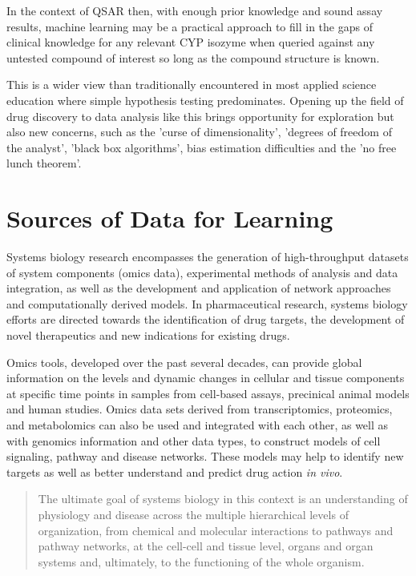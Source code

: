 In the context of QSAR then, with enough prior knowledge and sound assay results, machine learning may be a practical approach to fill in the gaps of clinical knowledge for any relevant CYP isozyme when queried against any untested compound of interest so long as the compound structure is known.

This is a wider view than traditionally encountered in most applied science education where simple hypothesis testing predominates. Opening up the field of drug discovery to data analysis like this brings opportunity for exploration but also new concerns, such as the 'curse of dimensionality', 'degrees of freedom of the analyst', 'black box algorithms', bias estimation difficulties and the 'no free lunch theorem'. \cite{Boulesteix2014}

\section{Sources of Data for Learning}

Systems biology research encompasses the generation of high-throughput datasets of system components (omics data), experimental methods of analysis and data integration, as well as the development and application of network approaches and computationally derived models. In pharmaceutical research, systems biology efforts are directed towards the identification of drug targets, the development of novel therapeutics and new indications for existing drugs. \cite{Berg2014}

Omics tools, developed over the past several decades, can provide global information on the levels and dynamic changes in cellular and tissue components at specific time points in samples from cell-based assays, precinical animal models and human studies. Omics data sets derived from transcriptomics, proteomics, and metabolomics can also be used and integrated with each other, as well as with genomics information and other data types, to construct models of cell signaling, pathway and disease networks. These models may help to identify new targets as well as better understand and predict drug action \textit{in vivo}.

\begin{quote}
The ultimate goal of systems biology in this context is an understanding of physiology and disease across the multiple hierarchical levels of organization, from chemical and molecular interactions to pathways and pathway networks, at the cell-cell and tissue level, organs and organ systems and, ultimately, to the functioning of the whole organism. \cite{Berg2014}
\end{quote}

